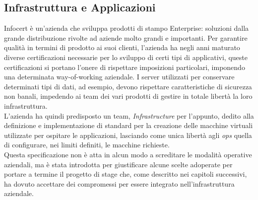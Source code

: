 \subsection{Infrastruttura e Applicazioni}
Infocert è un'azienda che sviluppa prodotti di stampo Enterprise: soluzioni dalla grande distribuzione rivolte ad aziende molto grandi e importanti. Per garantire qualità in termini di prodotto ai suoi clienti, l'azienda ha negli anni maturato diverse certificazioni necessarie per lo sviluppo di certi tipi di applicativi, queste certificazioni si portano l'onere di rispettare imposizioni particolari, imponendo una determinata \gls{way-of-working} aziendale.
I server utilizzati per conservare determinati tipi di dati, ad esempio, devono rispettare caratteristiche di sicurezza non banali, impedendo ai team dei vari prodotti di gestire in totale libertà la loro infrastruttura. \\
L'azienda ha quindi predisposto un team, \textit{Infrastructure} per l'appunto, dedito alla definizione e implementazione di standard per la creazione delle macchine virtuali utilizzate per ospitare le applicazioni, lasciando come unica libertà agli \textit{ops} quella di configurare, nei limiti definiti, le macchine richieste. \\
Questa specificazione non è atta in alcun modo a screditare le modalità operative aziendali, ma è stata introdotta per giustificare alcune scelte adoperate per portare a termine il progetto di stage che, come descritto nei capitoli successivi, ha dovuto accettare dei compromessi per essere integrato nell'infrastruttura aziendale.
